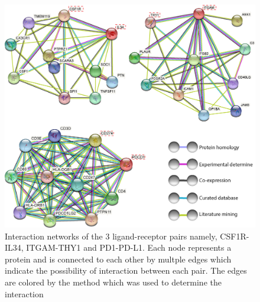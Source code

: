 \begin{figure}[htp]
\renewcommand{\figurename}{Supplementary Figure}
    \centering
    \includegraphics[width=0.66\columnwidth]{Chapter2/Figures/Supplemental_Fig_S1.png}
    \caption{Interaction networks of the 3 ligand-receptor pairs namely, CSF1R-IL34, ITGAM-THY1 and PD1-PD-L1. Each node represents a protein and is connected to each other by multple edges which indicate the possibility of interaction between each pair. The edges are colored by the method which was used to determine the interaction}
    \label{fig:Chap2_Supfigure1}
\end{figure}
